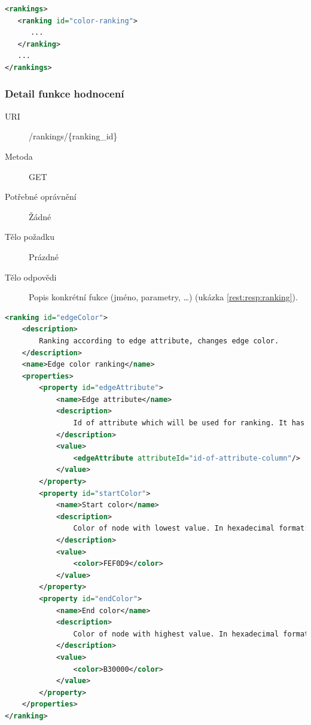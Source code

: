 \documentclass[thesis=M,czech]{FITthesis}[2014/05/6]
\begin{document}
\begin{lstlisting}[caption=Tělo odpovědi zdroje /rankings (GET), label=rest:resp:rankings, language=xml]
<rankings>
   <ranking id="color-ranking">
      ...
   </ranking>
   ...
</rankings>
\end{lstlisting}  

\subsubsection{Detail funkce hodnocení}
\begin{description}
  \item[URI] /rankings/\{ranking\_id\}
  \item[Metoda] GET
  \item[Potřebné oprávnění] Žádné
  \item[Tělo požadku] Prázdné
  \item[Tělo odpovědi] Popis konkrétní fukce (jméno, parametry, \ldots) (ukázka \ref{rest:resp:ranking}).
\end{description}

\begin{lstlisting}[caption=Tělo odpovědi zdroje /rankings/\{ranking\_id\} (GET), label=rest:resp:ranking, language=xml]
<ranking id="edgeColor">
    <description>
        Ranking according to edge attribute, changes edge color.
    </description>
    <name>Edge color ranking</name>
    <properties>
        <property id="edgeAttribute">
            <name>Edge attribute</name>
            <description>
                Id of attribute which will be used for ranking. It has to be one of already calculated edge attributes (see GEXF format)
            </description>
            <value>
                <edgeAttribute attributeId="id-of-attribute-column"/>
            </value>
        </property>
        <property id="startColor">
            <name>Start color</name>
            <description>
                Color of node with lowest value. In hexadecimal format: RRGGBB, e.g. FEF0D9
            </description>
            <value>
                <color>FEF0D9</color>
            </value>
        </property>
        <property id="endColor">
            <name>End color</name>
            <description>
                Color of node with highest value. In hexadecimal format: RRGGBB, e.g. B30000
            </description>
            <value>
                <color>B30000</color>
            </value>
        </property>
    </properties>
</ranking>
\end{lstlisting}  
\end{document}
